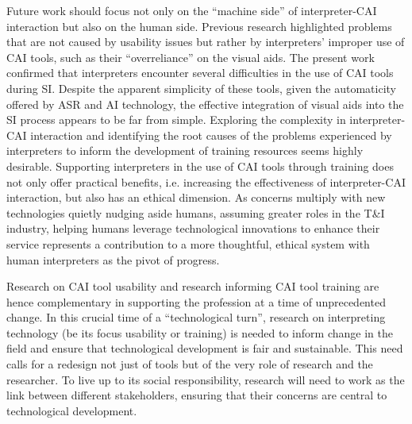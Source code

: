 Future work should focus not only on the ``machine side'' of interpreter-CAI interaction but also on the human side. Previous research highlighted problems that are not caused by usability issues but rather by interpreters’ improper use of CAI tools, such as their ``overreliance'' \citep{defrancq2021automatic} on the visual aids. The present work confirmed that interpreters encounter several difficulties in the use of CAI tools during SI. Despite the apparent simplicity of these tools, given the automaticity offered by ASR and AI technology, the effective integration of visual aids into the SI process appears to be far from simple. Exploring the complexity in interpreter-CAI interaction and identifying the root causes of the problems experienced by interpreters to inform the development of training resources seems highly desirable. Supporting interpreters in the use of CAI tools through training does not only offer practical benefits, i.e. increasing the effectiveness of interpreter-CAI interaction, but also has an ethical dimension. As concerns multiply with new technologies quietly nudging aside humans, assuming greater roles in the T\&I industry, helping humans leverage technological innovations to enhance their service represents a contribution to a more thoughtful, ethical system with human interpreters as the pivot of progress.

Research on CAI tool usability and research informing CAI tool training are hence complementary in supporting the profession at a time of unprecedented change. In this crucial time of a ``technological turn'', research on interpreting technology (be its focus usability or training) is needed to inform change in the field and ensure that technological development is fair and sustainable. This need calls for a redesign not just of tools but of the very role of research and the researcher. To live up to its social responsibility, research will need to work as the link between different stakeholders, ensuring that their concerns are central to technological development.
